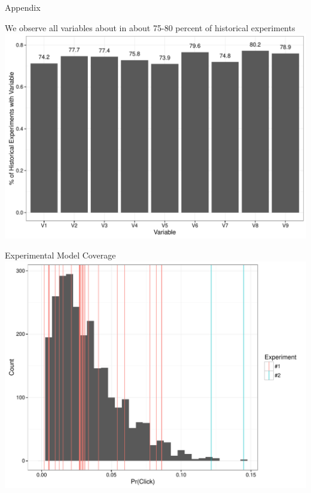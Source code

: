 \documentclass[11pt,xcolor=svgnames]{beamer}
\begin{document}
\begin{frame}[c]{ }
\centering
Appendix
\end{frame}

\begin{frame}
We observe all variables about in about 75-80 percent of historical experiments
\includegraphics[width=\textwidth]{hist_freq.pdf}
\end{frame}

\begin{frame}
Experimental Model Coverage
\includegraphics[width=\textwidth]{hist.pdf}
\end{frame}
\end{document}
